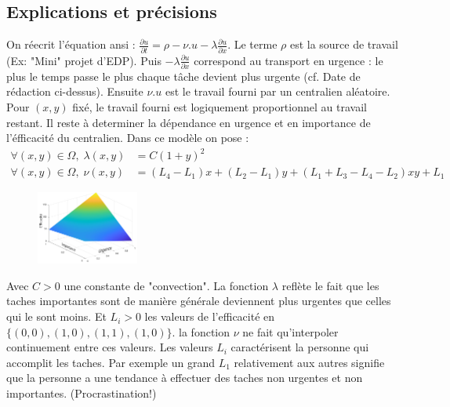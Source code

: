 \documentclass[french]{article}
\begin{document}
    \subsection{Explications et précisions}
    On réecrit l'équation ansi : $\frac{\partial u}{\partial t} = \rho - \nu.u - \lambda\frac{\partial u}{\partial x}$. 
    Le terme $\rho$ est la source de travail (Ex: "Mini" projet d'EDP). Puis $ - \lambda\frac{\partial u}{\partial x}$ 
    correspond au transport en urgence : le plus le temps passe le plus chaque tâche devient plus urgente 
    (cf. Date de rédaction ci-dessus). Ensuite $\nu.u$ est le travail fourni par un centralien aléatoire. Pour $(x,y)$ fixé, le travail fourni 
    est logiquement proportionnel au travail restant. Il reste à determiner la dépendance en urgence et en importance 
    de l'éfficacité du centralien. Dans ce modèle on pose :
    \begin{align}
        \forall(x,y)\in\Omega, \; \lambda(x,y) &= C(1+y)^2 \\
        \forall(x,y)\in\Omega, \; \nu(x,y) &= (L_4-L_1)x+(L_2-L_1)y+(L_1+L_3-L_4-L_2)xy+L_1
    \end{align}
    

    \begin{figure}
        \begin{center}
            \includegraphics[width=0.30\textwidth]{Figures/Efficacite.png}
        \end{center}
        \vspace{-40pt}
    \end{figure}

        Avec $C > 0$ une constante de "convection". La fonction $\lambda$ reflète le fait 
        que les taches importantes sont de manière générale deviennent plus urgentes que celles qui le sont moins.
    Et $L_i > 0$ les valeurs de l'efficacité en $\{(0,0),(1,0),(1,1),(1,0)\}$. la fonction 
    $\nu$ ne fait qu'interpoler continuement entre ces valeurs. Les valeurs $L_i$ 
    caractérisent la personne qui accomplit les taches. Par exemple un grand $L_1$ 
    relativement aux autres signifie que  la personne a une tendance à effectuer des 
    taches non urgentes et non importantes. (Procrastination!)
    
\end{document}
